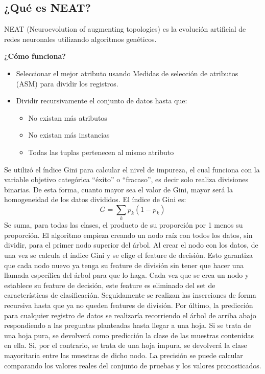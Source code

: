 \documentclass{article}
\begin{document}
\subsection{¿Qué es NEAT?}
NEAT (Neuroevolution of augmenting topologies) es la evolución artificial de redes neuronales utilizando algoritmos genéticos. \textcite{neat2002}

\textbf{¿Cómo funciona?}

\begin{itemize}
        \item Seleccionar el mejor atributo usando Medidas de selección de atributos (ASM) para dividir los registros.
        \item Dividir recursivamente el conjunto de datos hasta que:
        \begin{itemize}
          \item No existan más atributos
          \item No existan más instancias
          \item Todas las tuplas pertenecen al mismo atributo
        \end{itemize}
\end{itemize}

Se utilizó el índice Gini para calcular el nivel de impureza, el cual funciona con la variable objetivo categórica “éxito” o  “fracaso”, es decir solo realiza divisiones binarias. De esta forma, cuanto mayor sea el valor de Gini, mayor será la homogeneidad de los datos divididos.
El índice de Gini es: \[G = \sum_{k}p_{k}(1-p_{k})\]
Se suma, para todas las clases, el producto de su proporción por 1 menos su proporción.
El algoritmo empieza creando un nodo raíz con todos los datos, sin dividir, para el primer nodo superior del árbol. Al crear el nodo con los datos, de una vez se calcula el índice Gini y se elige el feature de decisión. Esto garantiza que cada nodo nuevo ya tenga su feature de división sin tener que hacer una llamada específica del árbol para que lo haga. Cada vez que se crea un nodo y establece su feature de decisión, este feature es eliminado del set de características de clasificación.
Seguidamente se realizan las inserciones de forma recursiva hasta que ya no queden features de división.
Por último, la predicción para cualquier registro de datos se realizaría recorriendo el árbol de arriba abajo respondiendo a las preguntas planteadas hasta llegar a una hoja. Si se trata de una hoja pura, se devolverá como predicción la clase de las muestras contenidas en ella. Si, por el contrario, se trata de una hoja impura, se devolverá la clase mayoritaria entre las muestras de dicho nodo. La precisión se puede calcular comparando los valores reales del conjunto de pruebas y los valores pronosticados.
\end{document}
